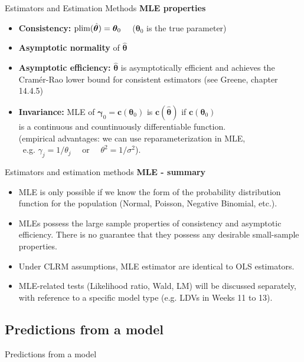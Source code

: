 \documentclass{beamer}
\begin{document}
\begin{frame}{Estimators and Estimation Methods}
\textbf{MLE properties}\\
\begin{itemize}
    \item \textbf{Consistency:} $\textnormal{plim}(\hat{\bm{\theta}}) = \bm{\theta}_0$ ~~($\bm{\theta}_0$ is the true parameter)
    \medskip
    \item \textbf{Asymptotic normality} of $\bm{\hat{\theta}}$
    \medskip
    \item \textbf{Asymptotic efficiency:}  $\bm{\hat{\theta}}$ is asymptotically efficient and achieves the Cramér-Rao lower bound for consistent estimators (see Greene, chapter 14.4.5)
    \medskip
    \item \textbf{Invariance:} MLE of $\bm{\gamma}_0=\bm{c}(\bm{\theta}_0)$ is $\bm{c}(\bm{\hat{\theta}})$ if $\bm{c}(\bm{\theta}_0)$ \\is a continuous and countinuously differentiable function.\\ \smallskip \footnotesize{ 
    (empirical advantages: we can use reparameterization in MLE, \\~e.g. $\gamma_j = 1/\theta_j$ ~~or~~ $\theta^2 = 1/\sigma^2$).}
\end{itemize}
\end{frame}
\begin{frame}{Estimators and estimation methods}
\textbf{MLE - summary}\\
\begin{itemize}
\item MLE is only possible if we know the form of the probability distribution function for the population (Normal, Poisson, Negative Binomial, etc.).
\medskip
\item MLEs possess the large sample properties of consistency and asymptotic efficiency. There is no guarantee that they possess any desirable small-sample properties. 
\medskip
\item Under CLRM assumptions, MLE estimator are identical to OLS estimators.
\medskip
\item MLE-related tests (Likelihood ratio, Wald, LM) will be discussed separately, with reference to a specific model type (e.g. LDVs in Weeks 11 to 13).
\end{itemize}
\end{frame}
\subsection{Predictions from a model}
\begin{frame}{Predictions from a model}
    
\end{frame}
\end{document}
